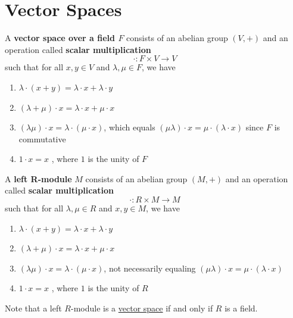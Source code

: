 \section{Vector Spaces}

  \begin{definition}
    \label{def:vector-space}
    A \textbf{vector space over a field $F$} consists of an abelian group $(V, +)$ and an operation called \textbf{scalar multiplication} 
    \begin{equation}
      \cdot: F \times V \rightarrow V
    \end{equation}
    such that for all $x, y\in V$ and $\lambda, \mu \in F$, we have 
    \begin{enumerate}
      \item $\lambda \cdot (x + y) = \lambda \cdot x + \lambda \cdot y$
      \item $(\lambda + \mu) \cdot x = \lambda \cdot x + \mu \cdot x$ 
      \item $(\lambda \mu) \cdot x = \lambda \cdot (\mu \cdot x )$, which equals $(\mu \lambda) \cdot x = \mu \cdot (\lambda \cdot x)$ since $F$ is commutative 
      \item $1 \cdot x = x$ , where $1$ is the unity of $F$
    \end{enumerate}
  \end{definition}

  \begin{definition}
    \label{def:left-r-module}
    A \textbf{left R-module} $M$ consists of an abelian group $(M, +)$ and an operation called \textbf{scalar multiplication}
    \begin{equation}
      \cdot: R \times M \to M
    \end{equation}
    such that for all $\lambda, \mu \in R$ and $x, y \in M$, we have 
    \begin{enumerate}
      \item $\lambda \cdot (x + y) = \lambda \cdot x + \lambda \cdot y$
      \item $(\lambda + \mu) \cdot x = \lambda \cdot x + \mu \cdot x$ 
      \item $(\lambda \mu) \cdot x = \lambda \cdot (\mu \cdot x )$, not necessarily equaling $(\mu \lambda) \cdot x = \mu \cdot (\lambda \cdot x)$
      \item $1 \cdot x = x$ , where $1$ is the unity of $R$
    \end{enumerate}
    Note that a left $R$-module is a \hyperref[def:vector-space]{vector space} if and only if $R$ is a field.
  \end{definition}

